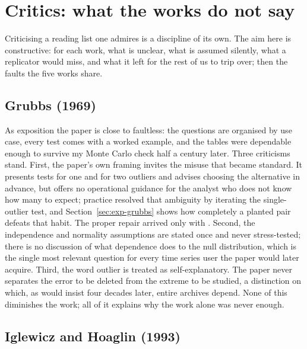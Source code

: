 \section{Critics: what the works do not say}
\label{sec:critics}

Criticising a reading list one admires is a discipline of its own. The aim
here is constructive: for each work, what is unclear, what is assumed
silently, what a replicator would miss, and what it left for the rest of us
to trip over; then the faults the five works share.

\subsection{Grubbs (1969)}

As exposition the paper is close to faultless: the questions are organised
by use case, every test comes with a worked example, and the tables were
dependable enough to survive my Monte Carlo check half a century later. Three
criticisms stand. First, the paper's own framing invites the misuse that
became standard. It presents tests for one and for two outliers and advises
choosing the alternative in advance, but offers no operational guidance for
the analyst who does not know how many to expect; practice resolved that
ambiguity by iterating the single-outlier test, and
Section~\ref{sec:exp-grubbs} shows how completely a planted pair defeats
that habit. The proper repair arrived only with \citet{rosner1983}. Second,
the independence and normality assumptions are stated once and never
stress-tested; there is no discussion of what dependence does to the null
distribution, which is the single most relevant question for every time
series user the paper would later acquire. Third, the word outlier is
treated as self-explanatory. The paper never separates the error to be
deleted from the extreme to be studied, a distinction on which, as
\citet{campbell2013} would insist four decades later, entire archives
depend. None of this diminishes the work; all of it explains why the work
alone was never enough.

\subsection{Iglewicz and Hoaglin (1993)}

